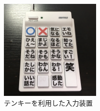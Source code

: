 \begin{figure}[h]
\centering
\includegraphics[width=5cm]{images/10key.png}
\caption{テンキーを利用した入力装置}
\label{10key}
\end{figure}